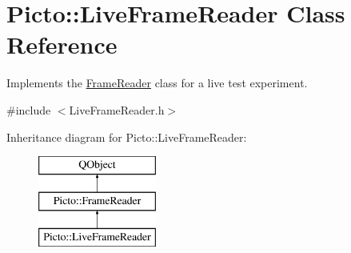 \hypertarget{class_picto_1_1_live_frame_reader}{\section{Picto\-:\-:Live\-Frame\-Reader Class Reference}
\label{class_picto_1_1_live_frame_reader}
}


Implements the \hyperlink{class_picto_1_1_frame_reader}{Frame\-Reader} class for a live test experiment.  




{\ttfamily \#include $<$Live\-Frame\-Reader.\-h$>$}

Inheritance diagram for Picto\-:\-:Live\-Frame\-Reader\-:\begin{figure}[H]
\begin{center}
\leavevmode
\includegraphics[height=3.000000cm]{class_picto_1_1_live_frame_reader}
\end{center}
\end{figure}
